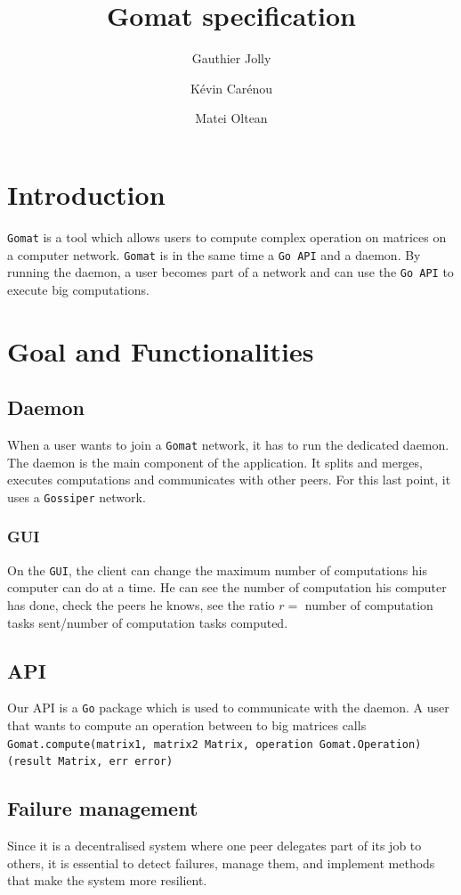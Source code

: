 \documentclass[a4paper,12pt]{article}
\title{Gomat specification}
\author{Gauthier Jolly \and K\'{e}vin Car\'{e}nou \and Matei Oltean}
\newcommand{\Gossiper}{\texttt{Gossiper}\xspace}
\newcommand{\Gomat}{\texttt{Gomat}\xspace}
\newcommand{\Go}{\texttt{Go}\xspace}
\begin{document}
\maketitle
\tableofcontents
\newpage
    \section{Introduction}
    \Gomat is a tool which allows users to compute complex operation on matrices on a computer network.
    \Gomat is in the same time a \texttt{Go API} and a daemon. By running the daemon, a user becomes part of a network and can use the \texttt{Go API} to execute big computations.

    \section{Goal and Functionalities}
        \subsection{Daemon}
    When a user wants to join a \Gomat network, it has to run the dedicated daemon. The daemon is the main component of the application. It splits and merges, executes computations and communicates with other peers. For this last point, it uses a \Gossiper network.

        \subsubsection{GUI}
    On the \texttt{GUI}, the client can change the maximum number of computations his computer can do at a time. He can see the number of computation his computer has done, check the peers he knows, see the ratio $r =$ number of computation tasks sent/{number of computation tasks computed}.

        \subsection{API}
        Our API is a \Go package which is used to communicate with the daemon. A user that wants to compute an operation between to big matrices calls\\
    \texttt{Gomat.compute(matrix1, matrix2 Matrix, operation Gomat.Operation) (result Matrix, err error)}

        \subsection{Failure management}
    Since it is a decentralised system where one peer delegates part of its job to others, it is essential to detect failures, manage them, and implement methods that make the system more resilient.
\end{document}
